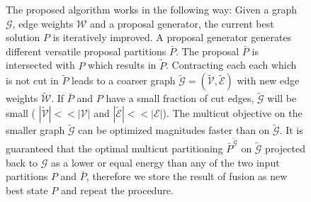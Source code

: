 \begin{figure}[H]
\caption{
    The proposed algorithm works in the following way:
    Given a graph $\mathcal{G}$, edge weights $\mathcal{W}$ and
    a proposal generator, the current best solution $P$ is iteratively improved.
    A proposal generator generates different versatile
    proposal partitions $\bar{P}$.
    The proposal  $\bar{P}$ is intersected with $P$ which results in
    $\tilde{P}$. Contracting each each which is not 
    cut in $\tilde{P}$ leads to a coarser graph  
    $\tilde{\mathcal{G}} = ( \tilde{\mathcal{V}}, \tilde{\mathcal{E}} )$ 
    with new edge weights $\tilde{\mathcal{W}}$.
    If  $\bar{P}$ and $P$ have a small fraction of cut edges, $\tilde{\mathcal{G}}$ will be small ( $|\tilde{\mathcal{V}}| << |\mathcal{V}|$
    and $|\tilde{\mathcal{E}}| << |\mathcal{E}|$).
    The multicut objective on the smaller graph $\tilde{\mathcal{G}}$ can be optimized magnitudes 
    faster than on $\tilde{\mathcal{G}}$.
    It is guaranteed that the optimal multicut partitioning $\bar{P}^{\tilde{\mathcal{G}}}$ on $\tilde{\mathcal{G}}$ projected 
    back to $\mathcal{G}$ as a lower or equal energy than any of the two input partitions $P$ and $\bar{P}$, 
    therefore we store the result of fusion as new best state $P$ and repeat the procedure.
}\label{fig:algo_graph}
\end{figure}


